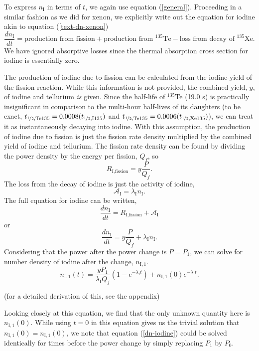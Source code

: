 \documentclass{report}
\begin{document}
To express $n_{\text{I}}$ in terms of $t$, we again use equation (\ref{general}). Proceeding in a similar fashion as we did for xenon, we explicitly write out the equation for iodine akin to equation (\ref{text-dn-xenon})
\begin{equation}
\label{text-dn-iodine}
\frac{dn_{\text{I}}}{dt} = \text{production from fission} + \text{production from }^{135}\text{Te} - \text{loss from decay of }^{135}\text{Xe}.
\end{equation}
We have ignored absorptive losses since the thermal absorption cross section for iodine is essentially zero. 

The production of iodine due to fission can be calculated from the iodine-yield of the fission reaction. While this information is not provided, the combined yield, $y$, of iodine and tellurium \textit{is} given. Since the half-life of $^{135}$Te (19.0 s) is practically insignificant in comparison to the multi-hour half-lives of its daughters (to be exact, $t_{\nicefrac{1}{2},\text{Te135}} = 0.0008(t_{\nicefrac{1}{2},\text{I135}})$ and $t_{\nicefrac{1}{2},\text{Te135}} = 0.0006(t_{\nicefrac{1}{2},\text{Xe135}})$), we can treat it as instantaneously decaying into iodine. With this assumption, the production of iodine due to fission is just the fission rate density multiplied by the combined yield of iodine and tellurium. The fission rate density can be found by dividing the power density by the energy per fission, $Q_f$, so
$$ R_{\text{I,fission}} = y\frac{P}{Q_f} .$$
The loss from the decay of iodine is just the activity of iodine,
$$ \mathcal{A}_{\text{I}} = \lambda_{\text{I}}n_{\text{I}}. $$
The full equation for iodine can be written,
$$ \frac{dn_{\text{I}}}{dt} = R_{\text{I,fission}} + \mathcal{A}_{\text{I}} $$
or 
\begin{equation}
\label{dn-iodine}
\frac{dn_{\text{I}}}{dt} = y\frac{P}{Q_f} + \lambda_{\text{I}}n_{\text{I}} .
\end{equation}
Considering that the power after the power change is $P=P_1$, we can solve for number density of iodine after the change, $n_{\text{I},1}$.
\begin{equation}
\label{n-iodine1}
n_{\text{I},1}(t) = \frac{y P_1}{\lambda_{\text{I}}Q_f}\left(1-e^{-\lambda_{\text{I}}t}\right) + n_{\text{I},1}(0)e^{-\lambda_{\text{I}}t}.
\end{equation}
\begin{center}(for a detailed derivation of this, see the appendix)\end{center}
Looking closely at this equation, we find that the only unknown quantity here is $n_{\text{I},1}(0)$. While using $t=0$ in this equation gives us the trivial solution that $n_{\text{I},1}(0) = n_{\text{I},1}(0)$, we note that equation (\ref{dn-iodine}) could be solved identically for times before the power change by simply replacing $P_1$ by $P_0$. 
\end{document}
